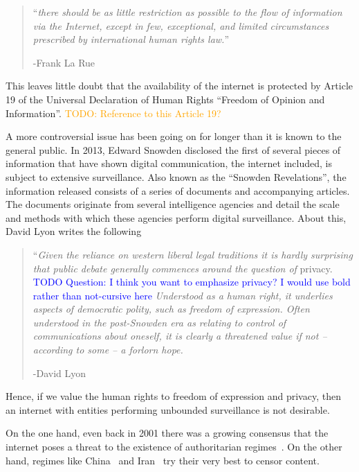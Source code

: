 \documentclass[a4paper,11pt]{book}
\newcommand\nicetohave[1]{\textcolor{orange}{TODO: #1}}
\newcommand\question[1]{\textcolor{blue}{TODO Question: #1}}
\theoremstyle{definition}
\begin{document}
\begin{quote}
    ``\textit{there should be as little restriction as possible  to  the  flow  of  information  via  the  Internet,
    except  in  few,  exceptional,  and  limited  circumstances  prescribed  by  international  human  rights  law.}'' 
    
    -Frank La Rue  
\end{quote}

This leaves little doubt that the availability of the internet is protected by Article 19 of
the Universal Declaration of Human Rights ``Freedom of Opinion and Information''. \nicetohave{Reference to this Article
19?}

A more controversial issue has been going on for longer than it is known to the general public.
In 2013, Edward Snowden disclosed the first of several pieces of information that
have shown digital communication, the internet included, is subject to extensive surveillance.
Also known as the ``Snowden Revelations'', the information released consists of a series
of documents and accompanying articles. The documents originate from several intelligence 
agencies and detail the scale and methods with which these agencies perform digital
surveillance. 
About this, David Lyon writes the following~\cite{lyon2014surveillance}

\begin{quote}
    ``\textit{Given the reliance on western liberal legal traditions
    it is hardly surprising that public debate generally 
    commences around the question of} privacy. 
		\question{I think you want to emphasize privacy? I would use bold rather than not-cursive here}
    \textit{Understood as a human right, it underlies aspects of democratic polity,
    such as freedom of expression. 
    Often understood in the post-Snowden era as relating to 
    control of communications about oneself, 
    it is clearly a threatened value if not – according to some – a forlorn hope.}

    -David Lyon
\end{quote}

Hence, if we value the human rights to freedom of expression and privacy, then an internet
with entities performing unbounded surveillance is not desirable. 

On the one hand, even back in 2001 there was a growing consensus that the internet poses
a threat to the existence of authoritarian regimes~\cite{kalathil2001internet}. 
On the other hand, regimes like China~\cite{endeshaw2004internet} and Iran~\cite{kimppa2010emancipatory}
try their very best to censor content. 
\end{document}
